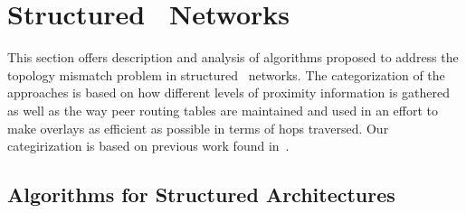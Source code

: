 \section{Structured \p\ Networks}
\label{section:structured}

This section offers description and analysis of algorithms proposed
to address the topology mismatch problem in structured \p\ networks. 
The categorization of the approaches is based on how different
levels of proximity information is gathered as well as  
the way peer routing tables are maintained and used in an effort to make 
overlays as efficient as possible in terms of hops traversed.
Our categirization is based on previous work 
found in~\cite{CDHR2002,CDCR2002,RSS2002}.

\subsection{Algorithms for Structured Architectures}






